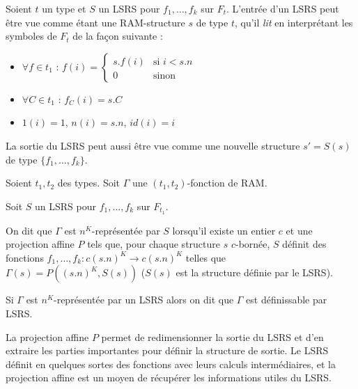 			\begin{remark}
				\label{rk:entree_LSRS}
				
				Soient $t$ un type et $S$ un LSRS pour $f_1, \dots, f_k$ sur $F_{t}$. 
				L'entrée d'un LSRS peut être vue comme étant une RAM-structure $s$ de type $t$, qu'il \emph{lit} en interprétant les symboles de $F_t$ de la façon suivante : 
				
				\begin{itemize}[itemsep=-1mm]
					\item 	$\forall f \in t_1$ :   $f(i) = 
					\left\lbrace \begin{array}{ll}
					s.f(i) & \text{si } i< s.n \\
					0 & \text{sinon}
					\end{array}\right.$
					
					\item 	$\forall C \in t_1$ :   $f_C(i) = s.C$
					\item 	$1(i) = 1$, $n(i) = s.n$, $id(i) = i$
				\end{itemize}
				
				La sortie du LSRS peut aussi être vue comme une nouvelle structure $s' = S(s)$ de type $\{f_1, \dots, f_k\}$.
			\end{remark}
			
			
			
			\begin{definition}
				\label{def:representee_par_LSRS}
				Soient $t_1, t_2$ des types. Soit $\Gamma$ une $(t_1, t_2)$-fonction de RAM.
				
				Soit $S$ un LSRS pour $f_1, \dots, f_k$ sur $F_{t_1}$. 
				
				On dit que $\Gamma$ est $n^K$-représentée par $S$ lorsqu'il existe un entier $c$ et une projection affine $P$ tels que, pour chaque structure $s$ $c$-bornée, $S$ définit des fonctions $f_1, \dots, f_k : c (s.n)^K \to c (s.n)^K$ telles que $\Gamma(s) = P((s.n)^K, S(s))$ ($S(s)$ est la structure définie par le LSRS).
				
				Si $\Gamma$ est $n^K$-représentée par un LSRS alors on dit que $\Gamma$ est définissable par LSRS. 
			\end{definition}
			
			La projection affine $P$ permet de redimensionner la sortie du LSRS et d'en extraire les parties importantes pour définir la structure de sortie. Le LSRS définit en quelques sortes des fonctions avec leurs calculs intermédiaires, et la projection affine est un moyen de récupérer les informations utiles du LSRS.
			
